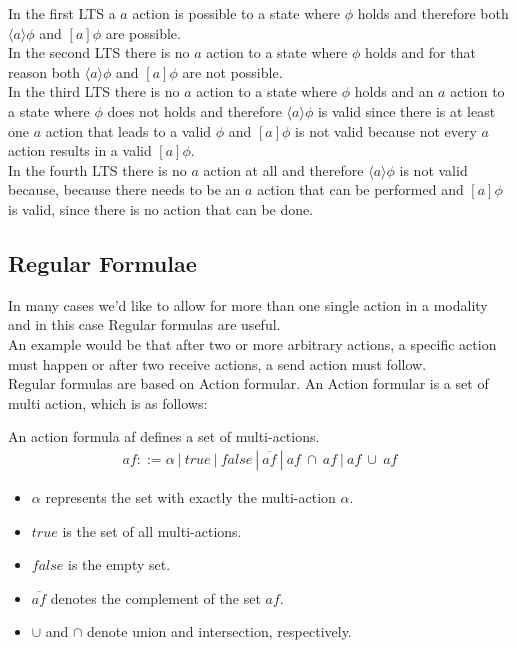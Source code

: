 \documentclass{clseminar}
\begin{document}
  In the first LTS a $a$ action is possible to a state where $\phi$ holds and therefore both $\langle{}a\rangle{}\phi$ and $[a]\phi$ are possible. \\
  In the second LTS there is no $a$ action to a state where $\phi$ holds and for that reason both $\langle{}a\rangle{}\phi$ and $[a]\phi$ are not possible. \\
  In the third LTS there is no $a$ action to a state where $\phi$ holds and an $a$ action to a state where $\phi$ does not holds and therefore $\langle{}a\rangle{}\phi$ is valid since there is at least one $a$ action that leads to a valid $\phi$ and $[a]\phi$ is not valid because not every $a$ action results in a valid $[a]\phi$. \\
  In the fourth LTS there is no $a$ action at all and therefore $\langle{}a\rangle{}\phi$ is not valid because, because there needs to be an $a$ action that can be performed and $[a]\phi$ is valid, since there is no action that can be done.

  \subsection{Regular Formulae}

  In many cases we'd like to allow for more than one single action in a modality and in this case Regular formulas are useful. \\
  An example would be that after two or more arbitrary actions, a specific action must happen or after two receive actions, a send action must follow. \\
  Regular formulas are based on Action formular. An Action formular is a set of multi action, which is as follows:

  \pagebreak
  An action formula af defines a set of multi-actions. \\

  \begin{align*}
    \mathit{af} ::= \alpha\ |\ \mathit{true}\ |\ \mathit{false}\ |\ \overline{\mathit{af}}\ |\ \mathit{af}\ \cap\ \mathit{af}\ |\ \mathit{af}\ \cup\ \mathit{af}
  \end{align*}

  \begin{itemize}
    \item $\alpha$ represents the set with exactly the multi-action $\alpha$.
    \item $\mathit{true}$ is the set of all multi-actions.
    \item $\mathit{false}$ is the empty set.
    \item $\overline{\mathit{af}}$ denotes the complement of the set $\mathit{af}$.
    \item $\cup$ and $\cap$ denote union and intersection, respectively.
  \end{itemize}
\end{document}
